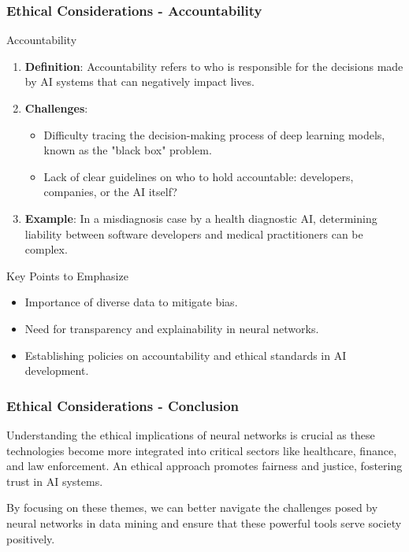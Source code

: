 \documentclass[aspectratio=169]{beamer}
\begin{document}
\begin{frame}[fragile]
    \frametitle{Ethical Considerations - Accountability}
    \begin{block}{Accountability}
        \begin{enumerate}
            \item \textbf{Definition}: Accountability refers to who is responsible for the decisions made by AI systems that can negatively impact lives.
            \item \textbf{Challenges}:
            \begin{itemize}
                \item Difficulty tracing the decision-making process of deep learning models, known as the "black box" problem.
                \item Lack of clear guidelines on who to hold accountable: developers, companies, or the AI itself?
            \end{itemize}
            \item \textbf{Example}: In a misdiagnosis case by a health diagnostic AI, determining liability between software developers and medical practitioners can be complex.
        \end{enumerate}
    \end{block}

    \begin{block}{Key Points to Emphasize}
        \begin{itemize}
            \item Importance of diverse data to mitigate bias.
            \item Need for transparency and explainability in neural networks.
            \item Establishing policies on accountability and ethical standards in AI development.
        \end{itemize}
    \end{block}
\end{frame}

\begin{frame}[fragile]
    \frametitle{Ethical Considerations - Conclusion}
    Understanding the ethical implications of neural networks is crucial as these technologies become more integrated into critical sectors like healthcare, finance, and law enforcement. An ethical approach promotes fairness and justice, fostering trust in AI systems.

    By focusing on these themes, we can better navigate the challenges posed by neural networks in data mining and ensure that these powerful tools serve society positively.
\end{frame}
\end{document}
